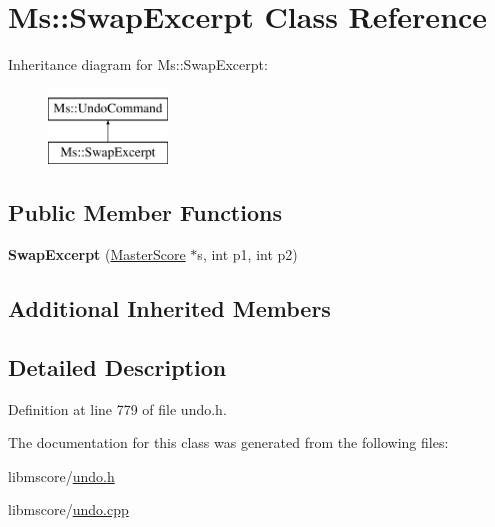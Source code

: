\hypertarget{class_ms_1_1_swap_excerpt}{}\section{Ms\+:\+:Swap\+Excerpt Class Reference}
\label{class_ms_1_1_swap_excerpt}
Inheritance diagram for Ms\+:\+:Swap\+Excerpt\+:\begin{figure}[H]
\begin{center}
\leavevmode
\includegraphics[height=2.000000cm]{class_ms_1_1_swap_excerpt}
\end{center}
\end{figure}
\subsection*{Public Member Functions}
\begin{DoxyCompactItemize}
\item 
\mbox{\label{class_ms_1_1_swap_excerpt_ace046822c38c7f518c50ef901eec89b4}} 
{\bfseries Swap\+Excerpt} (\hyperlink{class_ms_1_1_master_score}{Master\+Score} $\ast$s, int p1, int p2)
\end{DoxyCompactItemize}
\subsection*{Additional Inherited Members}


\subsection{Detailed Description}


Definition at line 779 of file undo.\+h.



The documentation for this class was generated from the following files\+:\begin{DoxyCompactItemize}
\item 
libmscore/\hyperlink{undo_8h}{undo.\+h}\item 
libmscore/\hyperlink{undo_8cpp}{undo.\+cpp}\end{DoxyCompactItemize}
